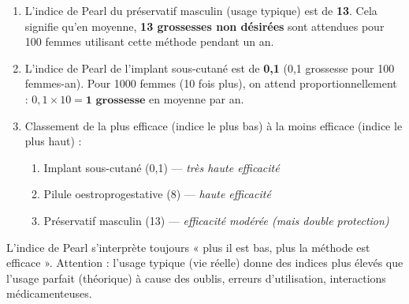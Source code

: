 \documentclass[11pt]{article}
\newcounter{popsec}
\newcounter{popsub}
\newcommand{\courssub}[1]{%
  \stepcounter{popsub}%
  \par\vspace{9pt}\noindent{\popxbold\fontsize{11.5}{13}\selectfont\color{popink}{\color{poporange}\thepopsec.\thepopsub}\hspace{6pt}#1}\par\nopagebreak\vspace{4pt}
}
\begin{document}
\begin{corrige}
\begin{enumerate}
\item L'indice de Pearl du préservatif masculin (usage typique) est de \textbf{13}. Cela signifie qu'en moyenne, \textbf{13 grossesses non désirées} sont attendues pour 100 femmes utilisant cette méthode pendant un an.
\item L'indice de Pearl de l'implant sous-cutané est de \textbf{0,1} (0,1 grossesse pour 100 femmes-an). Pour 1000 femmes (10 fois plus), on attend proportionnellement : $0,1 \times 10 = \textbf{1 grossesse}$ en moyenne par an.
\item Classement de la plus efficace (indice le plus bas) à la moins efficace (indice le plus haut) :
\begin{enumerate}
\item Implant sous-cutané (0,1) — \emph{très haute efficacité}
\item Pilule oestroprogestative (8) — \emph{haute efficacité}
\item Préservatif masculin (13) — \emph{efficacité modérée (mais double protection)}
\end{enumerate}
\end{enumerate}
\begin{aretenir}
L'indice de Pearl s'interprète toujours « plus il est bas, plus la méthode est efficace ». Attention : l'usage typique (vie réelle) donne des indices plus élevés que l'usage parfait (théorique) à cause des oublis, erreurs d'utilisation, interactions médicamenteuses.
\end{aretenir}
\end{corrige}

\courssub{Je m'entraîne}
\end{document}
